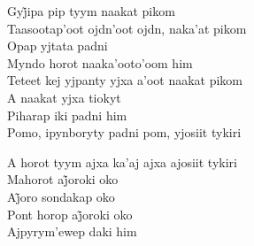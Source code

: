 \bigskip

\begin{linenumbers}\begingroup\raggedright
 
\noindent   Gyj̃ipa pip tyym naakat pikom\\
  Taasootap'oot ojdn'oot ojdn, naka'at pikom\\
  Opap yjtata padni\\
  Myndo horot naaka'ooto'oom him\\
  Teteet kej yjpanty yjxa a'oot naakat pikom\\
  A naakat yjxa tiokyt\\
  Piharap iki padni him\\
  Pomo, ipynboryty padni pom, yjosiit tykiri
 
\end{linenumbers}\endgroup

\bigskip

\begin{linenumbers}\begingroup\raggedright
 
\noindent   A horot tyym ajxa ka'aj ajxa ajosiit tykiri\\
  Mahorot aj̃oroki oko\\
  Aj̃oro sondakap oko\\
  Pont horop aj̃oroki oko\\
  Ajpyrym'ewep daki him
 
\end{linenumbers}\endgroup

\bigskip


